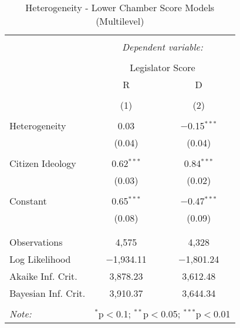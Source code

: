 
\begin{table}[!htbp] \centering 
  \caption{Heterogeneity - Lower Chamber Score Models (Multilevel)} 
  \label{div.het.mlm.models.h} 
\begin{tabular}{@{\extracolsep{5pt}}lcc} 
\\[-1.8ex]\hline 
\hline \\[-1.8ex] 
 & \multicolumn{2}{c}{\textit{Dependent variable:}} \\ 
\cline{2-3} 
\\[-1.8ex] & \multicolumn{2}{c}{Legislator Score} \\ 
 & R & D \\ 
\\[-1.8ex] & (1) & (2)\\ 
\hline \\[-1.8ex] 
 Heterogeneity & 0.03 & $-$0.15$^{***}$ \\ 
  & (0.04) & (0.04) \\ 
  & & \\ 
 Citizen Ideology & 0.62$^{***}$ & 0.84$^{***}$ \\ 
  & (0.03) & (0.02) \\ 
  & & \\ 
 Constant & 0.65$^{***}$ & $-$0.47$^{***}$ \\ 
  & (0.08) & (0.09) \\ 
  & & \\ 
\hline \\[-1.8ex] 
Observations & 4,575 & 4,328 \\ 
Log Likelihood & $-$1,934.11 & $-$1,801.24 \\ 
Akaike Inf. Crit. & 3,878.23 & 3,612.48 \\ 
Bayesian Inf. Crit. & 3,910.37 & 3,644.34 \\ 
\hline 
\hline \\[-1.8ex] 
\textit{Note:}  & \multicolumn{2}{r}{$^{*}$p$<$0.1; $^{**}$p$<$0.05; $^{***}$p$<$0.01} \\ 
\end{tabular} 
\end{table} 
